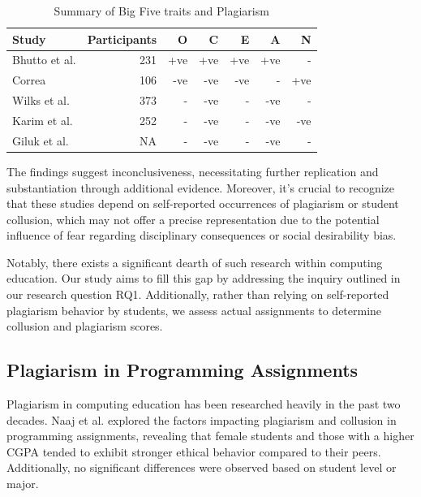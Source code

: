 \begin{table}[H]
  \centering
  \caption{Summary of Big Five traits and Plagiarism\\\label{tab:litSUmmary}}
    \vspace{-12pt}
  \begin{tabular}{p{2cm}rrrrrr}
    \toprule
    Study & Participants & O & C & E & A & N \\\midrule
    Bhutto et al.\cite{Bhutto2019ACS} & 231 & +ve & +ve & +ve & +ve & - \\
    Correa\cite{ChileanUniver} & 106 & -ve & -ve & -ve & - & +ve \\
    Wilks et al.\cite{Wilks2016-WILPTA-3} & 373 & - & -ve & - & -ve & - \\
    Karim et al. \cite{karimExploringRelationshipInternet2009} & 252 & - & -ve & - & -ve & -ve \\
    Giluk et al.\cite{Giluk2015BigFP} & NA & - & -ve & - & -ve & - \\ \bottomrule
  \end{tabular} \vspace{-8pt}
\end{table}

The findings suggest inconclusiveness, necessitating further replication and substantiation through additional evidence. Moreover, it's crucial to recognize that these studies depend on self-reported occurrences of plagiarism or student collusion, which may not offer a precise representation due to the potential influence of fear regarding disciplinary consequences or social desirability bias. 

Notably, there exists a significant dearth of such research within computing education. Our study aims to fill this gap by addressing the inquiry outlined in our research question RQ1. Additionally, rather than relying on self-reported plagiarism behavior by students, we assess actual assignments to determine collusion and plagiarism scores.

\subsection{Plagiarism in Programming Assignments}
Plagiarism in computing education has been researched heavily in the past two decades. Naaj et al. \cite{8937362} explored the factors impacting plagiarism and collusion in programming assignments, revealing that female students and those with a higher CGPA tended to exhibit stronger ethical behavior compared to their peers. Additionally, no significant differences were observed based on student level or major. 

